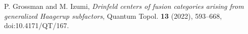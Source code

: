 P. Grossman and M. Izumi,
\emph{Drinfeld centers of fusion categories arising from generalized Haagerup subfactors},
Quantum Topol. \textbf{13} (2022), 593--668, doi:10.4171/QT/167.
